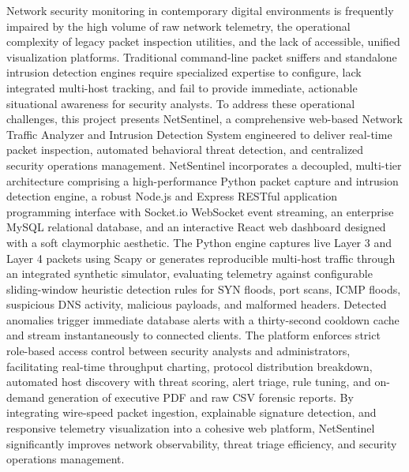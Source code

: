 \documentclass[a4paper,12pt]{report}
\begin{document}
	Network security monitoring in contemporary digital environments is frequently impaired by the high volume of raw network telemetry, the operational complexity of legacy packet inspection utilities, and the lack of accessible, unified visualization platforms. Traditional command-line packet sniffers and standalone intrusion detection engines require specialized expertise to configure, lack integrated multi-host tracking, and fail to provide immediate, actionable situational awareness for security analysts. To address these operational challenges, this project presents NetSentinel, a comprehensive web-based Network Traffic Analyzer and Intrusion Detection System engineered to deliver real-time packet inspection, automated behavioral threat detection, and centralized security operations management. NetSentinel incorporates a decoupled, multi-tier architecture comprising a high-performance Python packet capture and intrusion detection engine, a robust Node.js and Express RESTful application programming interface with Socket.io WebSocket event streaming, an enterprise MySQL relational database, and an interactive React web dashboard designed with a soft claymorphic aesthetic. The Python engine captures live Layer 3 and Layer 4 packets using Scapy or generates reproducible multi-host traffic through an integrated synthetic simulator, evaluating telemetry against configurable sliding-window heuristic detection rules for SYN floods, port scans, ICMP floods, suspicious DNS activity, malicious payloads, and malformed headers. Detected anomalies trigger immediate database alerts with a thirty-second cooldown cache and stream instantaneously to connected clients. The platform enforces strict role-based access control between security analysts and administrators, facilitating real-time throughput charting, protocol distribution breakdown, automated host discovery with threat scoring, alert triage, rule tuning, and on-demand generation of executive PDF and raw CSV forensic reports. By integrating wire-speed packet ingestion, explainable signature detection, and responsive telemetry visualization into a cohesive web platform, NetSentinel significantly improves network observability, threat triage efficiency, and security operations management.
	
	\clearpage
	
	\tableofcontents
	\newpage
	
\end{document}
